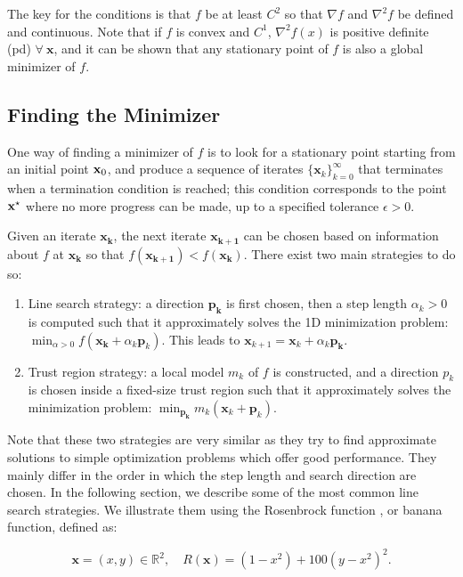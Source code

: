 The key for the conditions is that $f$ be at least $C^2$ so that
$\nabla f$ and $\nabla^2 f$ be defined and continuous. Note that if
$f$ is convex and $C^1$, $\nabla^2 f(x)$ is positive definite (pd)
$\forall~\mathbf{x}$, and it can be shown that any stationary point of
$f$ is also a global minimizer of $f$.

\subsection{Finding the Minimizer}

One way of finding a minimizer of $f$ is to look for a stationary
point starting from an initial point $\mathbf{x}_0$, and produce a
sequence of iterates $\{\mathbf{x}_k\}_{k=0}^{\infty}$ that terminates
when a termination condition is reached; this condition corresponds to
the point $\mathbf{x}^{\star}$ where no more progress can be made, up to a
specified tolerance $\epsilon > 0$.

Given an iterate $\mathbf{x_k}$, the next iterate $\mathbf{x_{k+1}}$
can be chosen based on information about $f$ at $\mathbf{x_k}$ so that
$f(\mathbf{x_{k+1}})<f(\mathbf{x_k})$. There exist two main strategies
to do so:

\begin{enumerate}
\item Line search strategy: a direction $\mathbf{p_k}$ is first
  chosen, then a step length $\alpha_k > 0$ is computed such that it
  approximately solves the 1D minimization problem: $\min_{\alpha>0}
  f(\mathbf{x_k}+\alpha_k\mathbf{p}_k)$. This leads to
  $\mathbf{x}_{k+1}=\mathbf{x}_k+\alpha_k\mathbf{p_k}.$
\item Trust region strategy: a local model $m_k$ of $f$ is
  constructed, and a direction $p_k$ is chosen inside a fixed-size
  trust region such that it approximately solves the minimization
  problem: $\min_{\mathbf{p_k}} m_k(\mathbf{x}_k+\mathbf{p}_k)$.
\end{enumerate}

Note that these two strategies are very similar as they try to find
approximate solutions to simple optimization problems which offer good
performance. They mainly differ in the order in which the step length
and search direction are chosen. In the following section, we describe
some of the most common line search strategies. We illustrate them
using the Rosenbrock function \cite{rosenbrock1960automatic}, or banana
function, defined as:

\begin{equation}
\mathbf{x} = (x,y) \in \mathbb R^2,\quad R(\mathbf{x}) =
(1-x^2)+100(y-x^2)^2.
\end{equation}

